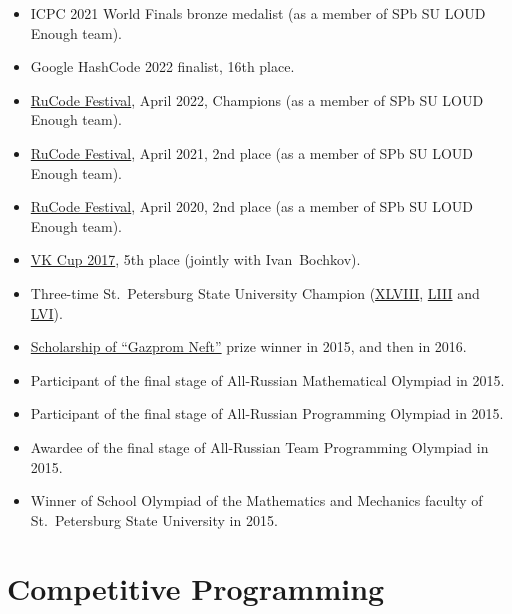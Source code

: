 \documentclass[a4paper, 11pt]{article}
\begin{document}
\begin{itemize}
	\item ICPC 2021 World Finals bronze medalist (as a member of SPb SU LOUD Enough team).

	\item Google HashCode 2022 finalist, 16th place.

	\item \href{https://rucode.net/kak-eto-bylo/}{RuCode Festival}, April 2022, Champions (as a member of SPb SU LOUD Enough team).

	\item \href{https://rucode.net/kak-eto-bylo/}{RuCode Festival}, April 2021, 2nd place (as a member of SPb SU LOUD Enough team).

	\item \href{http://rucode.it-edu.mipt.ru/rucode2020resAB}{RuCode Festival}, April 2020, 2nd place (as a member of SPb SU LOUD Enough team).

	\item \href{https://codeforces.com/blog/entry/53192}{VK Cup 2017}, 5th place (jointly with Ivan~Bochkov).

	\item Three-time St.~Petersburg State University Champion (\href{https://acm.math.spbu.ru/cgi-bin/monitor.pl/n171015.dat}{XLVIII}, \href{https://acm.math.spbu.ru/cgi-bin/monitor.pl/n190421.dat}{LIII} and \href{https://acm.math.spbu.ru/cgi-bin/monitor.pl/n201206.dat}{LVI}).

	\item \href{https://math-cs.spbu.ru/en/scholarships-rodnye-goroda/}{Scholarship of ``Gazprom Neft''} prize winner in 2015, and then in 2016.

	\item Participant of the final stage of All-Russian Mathematical Olympiad in 2015.

	\item Participant of the final stage of All-Russian Programming Olympiad in 2015.

	\item Awardee of the final stage of All-Russian Team Programming Olympiad in 2015.

	\item Winner of School Olympiad of the Mathematics and Mechanics faculty of St.~Petersburg State University in 2015.
\end{itemize}

\section*{Competitive Programming}
\end{document}
